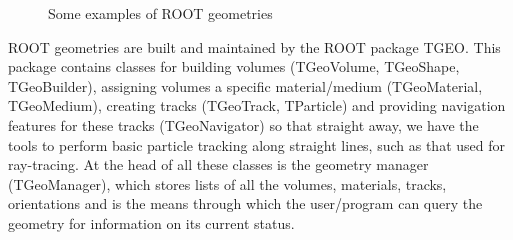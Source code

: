 \documentclass[11pt,a4paper,oneside]{article}
\begin{document}
\begin{figure}[!htbp] 
\centering 
{} \hspace{2mm} 
 \hspace{2mm}
 \hspace{2mm}
\caption{Some examples of ROOT geometries} 
\label{fig:RootGeometries} 
\end{figure}

ROOT geometries are built and maintained by the ROOT package TGEO. This package contains classes for building volumes (TGeoVolume, TGeoShape, TGeoBuilder), assigning volumes a specific material/medium (TGeoMaterial, TGeoMedium), creating tracks (TGeoTrack, TParticle) and providing navigation features for these tracks (TGeoNavigator) so that straight away, we have the tools to perform basic particle tracking along straight lines, such as that used for ray-tracing. At the head of all these classes is the geometry manager (TGeoManager), which stores lists of all the volumes, materials, tracks, orientations and is the means through which the user/program can query the geometry for information on its current status. 
\end{document}
